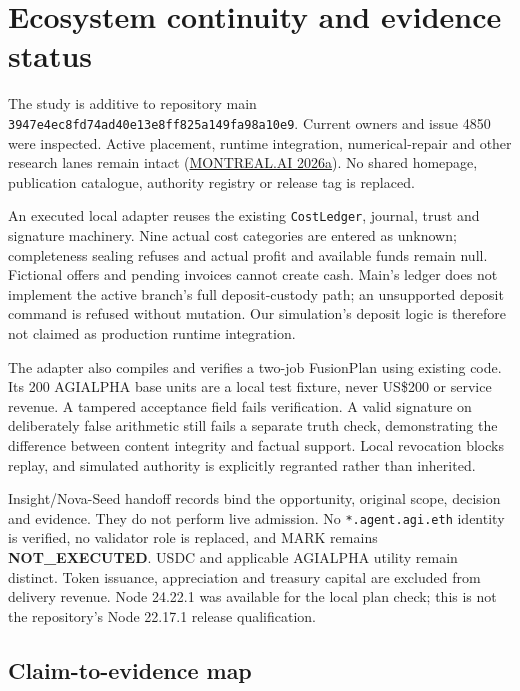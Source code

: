\documentclass[
  11pt,
  letterpaper,
]{article}
\begin{document}
\hypertarget{ecosystem-continuity-and-evidence-status}{%
\section{Ecosystem continuity and evidence
status}\label{ecosystem-continuity-and-evidence-status}}

The study is additive to repository main
\texttt{3947e4ec8fd74ad40e13e8ff825a149fa98a10e9}. Current owners and
issue 4850 were inspected. Active placement, runtime integration,
numerical-repair and other research lanes remain intact
(\protect\hyperlink{ref-coordination}{MONTREAL.AI 2026a}). No shared
homepage, publication catalogue, authority registry or release tag is
replaced.

An executed local adapter reuses the existing \texttt{CostLedger},
journal, trust and signature machinery. Nine actual cost categories are
entered as unknown; completeness sealing refuses and actual profit and
available funds remain null. Fictional offers and pending invoices
cannot create cash. Main's ledger does not implement the active branch's
full deposit-custody path; an unsupported deposit command is refused
without mutation. Our simulation's deposit logic is therefore not
claimed as production runtime integration.

The adapter also compiles and verifies a two-job FusionPlan using
existing code. Its 200 AGIALPHA base units are a local test fixture,
never US\$200 or service revenue. A tampered acceptance field fails
verification. A valid signature on deliberately false arithmetic still
fails a separate truth check, demonstrating the difference between
content integrity and factual support. Local revocation blocks replay,
and simulated authority is explicitly regranted rather than inherited.

Insight/Nova-Seed handoff records bind the opportunity, original scope,
decision and evidence. They do not perform live admission. No
\texttt{*.agent.agi.eth} identity is verified, no validator role is
replaced, and MARK remains \textbf{NOT\_EXECUTED}. USDC and applicable
AGIALPHA utility remain distinct. Token issuance, appreciation and
treasury capital are excluded from delivery revenue. Node 24.22.1 was
available for the local plan check; this is not the repository's Node
22.17.1 release qualification.


\hypertarget{claim-to-evidence-map}{%
\subsection{Claim-to-evidence map}\label{claim-to-evidence-map}}
\end{document}
